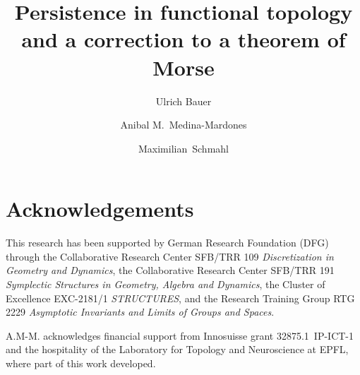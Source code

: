 \documentclass[nospthms, a4paper, final]{svjour3}
\theoremstyle{plain}
\theoremstyle{definition}
\begin{document}
	\title{Persistence in functional topology and a correction to a theorem of Morse}
	
	\author{Ulrich Bauer \and Anibal M.~Medina-Mardones \and Maximilian~Schmahl}
	
	
	
	\maketitle
	
	\begin{abstract}
		
	\end{abstract}
	
	\tableofcontents
	
	
	
	
	
	\appendix
	
	
	\section*{Acknowledgements}
	This research has been supported by German Research Foundation (DFG) through the Collaborative Research Center SFB/TRR 109 \emph{Discretization in Geometry and Dynamics}, the Collaborative Research Center SFB/TRR 191 \emph{Symplectic Structures in Geometry, Algebra and Dynamics}, the Cluster of Excellence EXC-2181/1 \emph{STRUCTURES}, and the Research Training Group RTG 2229 \emph{Asymptotic Invariants and Limits of Groups and Spaces}.
	
	A.M-M. acknowledges financial support from Innosuisse grant \mbox{32875.1 IP-ICT-1} and the hospitality of the Laboratory for Topology and Neuroscience at EPFL, where part of this work developed.
	
	
	
\end{document}
